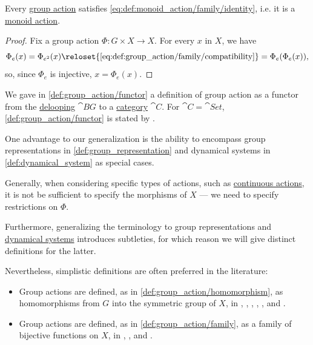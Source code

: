 \begin{proposition}\label{thm:group_action_is_monoid_action}
  Every \hyperref[def:group_action]{group action} satisfies \eqref{eq:def:monoid_action/family/identity}, i.e. it is a \hyperref[def:monoid_action]{monoid action}.
\end{proposition}
\begin{proof}
  Fix a group action \( \Phi: G \times X \to X \). For every \( x \) in \( X \), we have
  \begin{equation*}
    \Phi_e(x)
    =
    \Phi_{e^2}(x)
    \reloset {\eqref{eq:def:group_action/family/compatibility}} =
    \Phi_e(\Phi_e(x)),
  \end{equation*}
  so, since \( \Phi_e \) is injective, \( x = \Phi_e(x) \).
\end{proof}

\begin{remark}\label{rem:group_action_category}
  We gave in \cref{def:group_action/functor} a definition of group action as a functor from the \hyperref[def:monoid_delooping]{delooping} \( \cat{B} G \) to a \hyperref[def:category]{category} \( \cat{C} \). For \( \cat{C} = \cat{Set} \), \cref{def:group_action/functor} is stated by \textcite[example 1.3.10]{Perrone2024StartingCategoryTheory}.

  One advantage to our generalization is the ability to encompass group representations in \cref{def:group_representation} and dynamical systems in \cref{def:dynamical_system} as special cases.

  Generally, when considering specific types of actions, such as \hyperref[def:continuous_monoid_action]{continuous actions}, it is not be sufficient to specify the morphisms of \( X \) --- we need to specify restrictions on \( \Phi \).

  Furthermore, generalizing the terminology to group representations and \hyperref[def:dynamical_system]{dynamical systems} introduces subtleties, for which reason we will give distinct definitions for the latter.

  Nevertheless, simplistic definitions are often preferred in the literature:
  \begin{itemize}
    \item Group actions are defined, as in \cref{def:group_action/homomorphism}, as homomorphisms from \( G \) into the symmetric group of \( X \), in
    \cite[def. 1.1.1]{Berger1987GeometryI},
    \cite[def. 1.7]{Jacobson1985BasicAlgebraI},
    \cite[110]{Aluffi2009Algebra},
    \cite[159]{Knapp2016BasicAlgebra},
    \cite[def. 10.3.1]{Винберг2014КурсАлгебры},
    \cite[140]{Шафаревич2019ОсновныеПонятияАлгебры} and
    \cite[213]{Гуров2013ТеорияРешёток}.

    \item Group actions are defined, as in \cref{def:group_action/family}, as a family of bijective functions on \( X \), in
    \cite[5]{Rotman2017AdvancedModernAlgebraPart2},
    \cite[98]{Тыртышников2017ОсновыАлгебры},
    \cite[98]{Прасолов2004КомбинаторнаяИДифференциальнаяТопология} and
    \cite[102]{ГеновМиховскиМоллов1991Алгебра}.
  \end{itemize}
\end{remark}

